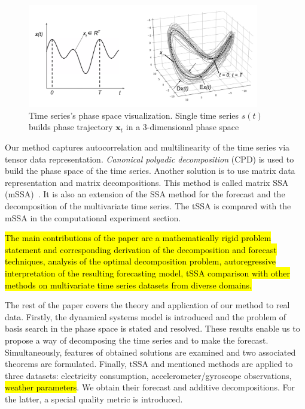 \documentclass[referee, pdflatex, sn-mathphys-num]{sn-jnl}
\theoremstyle{definition}
\theoremstyle{plain}
\begin{document}
	\begin{figure}[!htbp]
		\centering
		\includegraphics[width=0.9\textwidth, keepaspectratio]{phase_traj.png}
		\caption{Time series's phase space visualization. Single time series $ s(t) $ builds phase trajectory $ \mathbf{x}_t $ in a 3-dimensional phase space}\label{pic:phase_traj}
	\end{figure}
	
	Our method captures autocorrelation and multilinearity of the time series via tensor data representation. \emph{Canonical polyadic decomposition} (CPD) is used to build the phase space of the time series. Another solution is to use matrix data representation and matrix decompositions. This method is called matrix SSA (mSSA)~\cite{mSSA_overview}. It is also an extension of the SSA method for the forecast and the decomposition of the multivariate time series. The tSSA is compared with the mSSA in the computational experiment section.
	
	\hl{The main contributions of the paper are a mathematically rigid problem statement and corresponding derivation of the decomposition and forecast techniques, analysis of the optimal decomposition problem, autoregressive interpretation of the resulting forecasting model, tSSA comparison with other methods on multivariate time series datasets from diverse domains.}
	
	The rest of the paper covers the theory and application of our method to real data. Firstly, the dynamical systems model is introduced and the problem of basis search in the phase space is stated and resolved. These results enable us to propose a way of decomposing the time series and to make the forecast. Simultaneously, features of obtained solutions are examined and two associated theorems are formulated. Finally, tSSA and mentioned methods are applied to three datasets: electricity consumption, accelerometer/gyroscope observations, \hl{weather parameters}. We obtain their forecast and additive decompositions. For the latter, a special quality metric is introduced.
	
\end{document}
